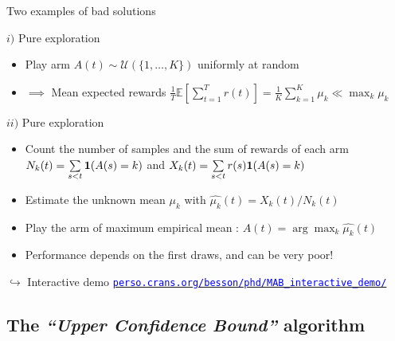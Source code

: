 \documentclass[11pt,english,ignorenonframetext,]{beamer}
\begin{document}
\begin{frame}{Two examples of bad solutions}

  \begin{exampleblock}{$i)$ Pure exploration}
    \begin{itemize}
      \item
      Play arm $A(t) \sim \mathcal{U}(\{1,\dots,K\})$ uniformly at random
      \item
      $\implies$ Mean expected rewards
      $ \frac{1}{T} \mathbb{E}\left[ \sum\limits_{t=1}^T r(t) \right] = \frac{1}{K} \sum\limits_{k=1}^K \mu_k \ll \max_k \mu_k$
    \end{itemize}
  \end{exampleblock}

  \pause

  \begin{exampleblock}{$ii)$ Pure exploration}
    \begin{itemize}
      \item
        Count the number of samples and the sum of rewards of each arm $N_k(t) = \sum\limits_{s < t} \bold{1}(A(s)=k)$ and $X_k(t) = \sum\limits_{s < t} r(s) \bold{1}(A(s)=k)$
      \item
        Estimate the \alert{unknown} mean $\mu_k$ with $\widehat{\mu_k}(t) = X_k(t) / N_k(t)$
      \item
        Play the arm of maximum empirical mean : $A(t) = \arg\max_k \widehat{\mu_k}(t)$
      \item
        Performance depends on the first draws, and can be very poor!
    \end{itemize}
  \end{exampleblock}

  \begin{tiny}
    $\hookrightarrow$
    Interactive demo
    \href{https://perso.crans.org/besson/phd/MAB_interactive_demo/}{\textcolor{blue}{\texttt{perso.crans.org/besson/phd/MAB\_interactive\_demo/}}}
  \end{tiny}

\end{frame}


\subsection{\hfill{}The \emph{``Upper Confidence Bound''} algorithm\hfill{}}
\end{document}
